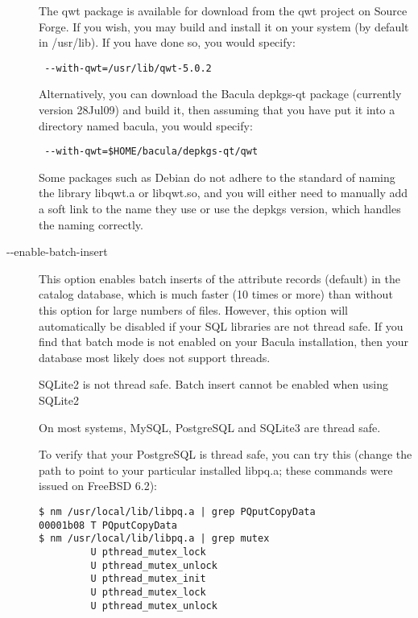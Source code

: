 \begin{description}
  The qwt package is available for download from
  the qwt project on Source Forge.  If you wish, you may build and 
  install it on your system (by default in /usr/lib). 
  If you have done so, you would specify:

\begin{verbatim}
 --with-qwt=/usr/lib/qwt-5.0.2
\end{verbatim}

  Alternatively, you can download the Bacula depkgs-qt package (currently
  version 28Jul09) and build it, then assuming that you have put it 
  into a directory named bacula, you would specify:

\begin{verbatim}
 --with-qwt=$HOME/bacula/depkgs-qt/qwt
\end{verbatim}

   Some packages such as Debian do not adhere to the standard of
   naming the library libqwt.a or libqwt.so, and you will either need
   to manually add a soft link to the name they use or use the
   depkgs version, which handles the naming correctly.


\item [ {-}{-}enable-batch-insert ]
   This option enables batch inserts of the attribute records (default) in
    the catalog database, which is much faster (10 times or more) than
   without this option for large numbers of files. However, this option
   will automatically be disabled if your SQL libraries are not
   thread safe. If you find that batch mode is not enabled on your Bacula
   installation, then your database most likely does not support threads.

   SQLite2 is not thread safe.  Batch insert cannot be enabled when using
   SQLite2

   On most systems, MySQL, PostgreSQL and SQLite3 are thread safe.

   To verify that your PostgreSQL is thread safe, you can try this
   (change the path to point to your particular installed libpq.a;
   these commands were issued on FreeBSD 6.2):

\begin{verbatim}
$ nm /usr/local/lib/libpq.a | grep PQputCopyData
00001b08 T PQputCopyData
$ nm /usr/local/lib/libpq.a | grep mutex
         U pthread_mutex_lock
         U pthread_mutex_unlock
         U pthread_mutex_init
         U pthread_mutex_lock
         U pthread_mutex_unlock
\end{verbatim}


\end{description}
